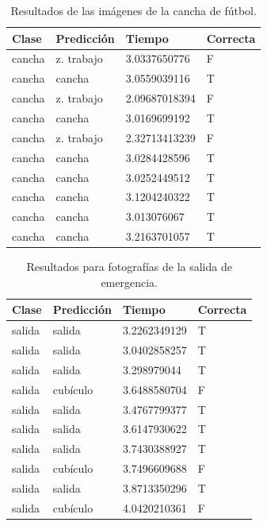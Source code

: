 \begin{table}[!h]
\centering
\begin{tabular}{|l|l|l|l|}
\hline
Clase        & Predicción   & Tiempo        & Correcta \\ \hline
cancha & z. trabajo        & 3.0337650776 & F        \\ \hline
cancha & cancha & 3.0559039116 & T        \\ \hline
cancha & z. trabajo        & 2.09687018394 & F        \\ \hline
cancha & cancha & 3.0169699192 & T        \\ \hline
cancha & z. trabajo        & 2.32713413239 & F        \\ \hline
cancha & cancha & 3.0284428596 & T        \\ \hline
cancha & cancha & 3.0252449512 & T        \\ \hline
cancha & cancha & 3.1204240322 & T        \\ \hline
cancha & cancha & 3.013076067  & T        \\ \hline
cancha & cancha & 3.2163701057 & T        \\ \hline
\end{tabular}
\caption{Resultados de las imágenes de la cancha de fútbol.}
\label{table:soccer_nao_results}
\end{table}

\begin{table}[!h]
\centering
\begin{tabular}{|l|l|l|l|}
\hline
Clase & Predicción & Tiempo        & Correcta \\ \hline
salida  & salida       & 3.2262349129 & T     \\ \hline
salida  & salida       & 3.0402858257 & T     \\ \hline
salida  & salida     & 3.298979044  & T    \\ \hline
salida  & cubículo     & 3.6488580704 & F    \\ \hline
salida  & salida       & 3.4767799377 & T     \\ \hline
salida  & salida       & 3.6147930622 & T     \\ \hline
salida  & salida       & 3.7430388927 & T     \\ \hline
salida  & cubículo     & 3.7496609688 & F    \\ \hline
salida  & salida       & 3.8713350296 & T     \\ \hline
salida  & cubículo     & 4.0420210361 & F    \\ \hline
\end{tabular}
\caption{Resultados para fotografías de la salida de emergencia.}
\label{table:exit}
\end{table}

